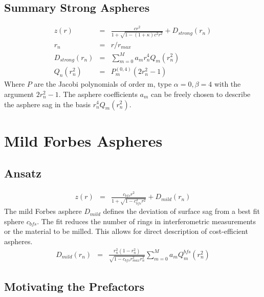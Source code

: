 \documentclass[10pt]{revtex4-1}
\renewcommand\r{r}
\newcommand\rmax{r_{max}}
\newcommand\rnorm{r_{n}}
\begin{document}
\subsection{Summary Strong Aspheres}
\begin{eqnarray}
	z(\r) &=& \frac{c \r^2}{1+\sqrt{1-(1+\kappa)c^2 \r^2}} + D_{strong}(\rnorm) \\
	\rnorm &=& \r / \rmax \\
  D_{strong}(\rnorm) &=& \sum_{m=0}^M a_m \rnorm^4 Q_m(\rnorm^2) \\
	Q_n(\rnorm^2) &=& P_m^{(0,4)} (2\rnorm^2-1)
\end{eqnarray}
Where $P$ are the Jacobi polynomials of order m, type $\alpha=0,\beta=4$ with the argument $2\rnorm^2-1$. 
The asphere coefficients $a_m$ can be freely chosen to describe the asphere sag in the basis $\rnorm^4 Q_m(\rnorm^2)$.


\section{Mild Forbes Aspheres}

\subsection{Ansatz}

\begin{eqnarray}
	z(\r) &=& \frac{c_{bfs} \r^2}{1+\sqrt{1-c_{bfs}^2 \r^2}} + D_{mild}(\rnorm)
\end{eqnarray}
The mild Forbes asphere $D_{mild}$ defines the deviation of surface sag from a best fit sphere $c_{bfs}$. The fit reduces the number of rings in interferometric measurements or the material to be milled. This allows for direct description of cost-efficient aspheres.
\begin{eqnarray}
	D_{mild}(\rnorm) &=&  \frac{\rnorm^2 (1-\rnorm^2)}{\sqrt{1 - c_{bfs} \rmax^2 \rnorm^2}}  
	  \sum_{m=0}^M a_m Q_m^{bfs}(\rnorm^2)
\end{eqnarray}

\subsection{Motivating the Prefactors}
\end{document}
